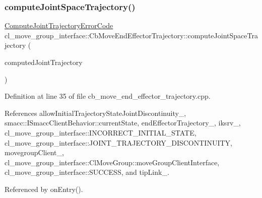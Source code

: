 \subsubsection{\texorpdfstring{compute\+Joint\+Space\+Trajectory()}{computeJointSpaceTrajectory()}}
{\footnotesize\ttfamily \hyperlink{namespacecl__move__group__interface_ae5fc1caf9a16ae5ad1c97c2e137a7017}{Compute\+Joint\+Trajectory\+Error\+Code} cl\+\_\+move\+\_\+group\+\_\+interface\+::\+Cb\+Move\+End\+Effector\+Trajectory\+::compute\+Joint\+Space\+Trajectory (\begin{DoxyParamCaption}\item[{moveit\+\_\+msgs\+::\+Robot\+Trajectory \&}]{computed\+Joint\+Trajectory }\end{DoxyParamCaption})\hspace{0.3cm}{\ttfamily [protected]}}



Definition at line 35 of file cb\+\_\+move\+\_\+end\+\_\+effector\+\_\+trajectory.\+cpp.



References allow\+Initial\+Trajectory\+State\+Joint\+Discontinuity\+\_\+, smacc\+::\+I\+Smacc\+Client\+Behavior\+::current\+State, end\+Effector\+Trajectory\+\_\+, iksrv\+\_\+, cl\+\_\+move\+\_\+group\+\_\+interface\+::\+I\+N\+C\+O\+R\+R\+E\+C\+T\+\_\+\+I\+N\+I\+T\+I\+A\+L\+\_\+\+S\+T\+A\+TE, cl\+\_\+move\+\_\+group\+\_\+interface\+::\+J\+O\+I\+N\+T\+\_\+\+T\+R\+A\+J\+E\+C\+T\+O\+R\+Y\+\_\+\+D\+I\+S\+C\+O\+N\+T\+I\+N\+U\+I\+TY, movegroup\+Client\+\_\+, cl\+\_\+move\+\_\+group\+\_\+interface\+::\+Cl\+Move\+Group\+::move\+Group\+Client\+Interface, cl\+\_\+move\+\_\+group\+\_\+interface\+::\+S\+U\+C\+C\+E\+SS, and tip\+Link\+\_\+.



Referenced by on\+Entry().


